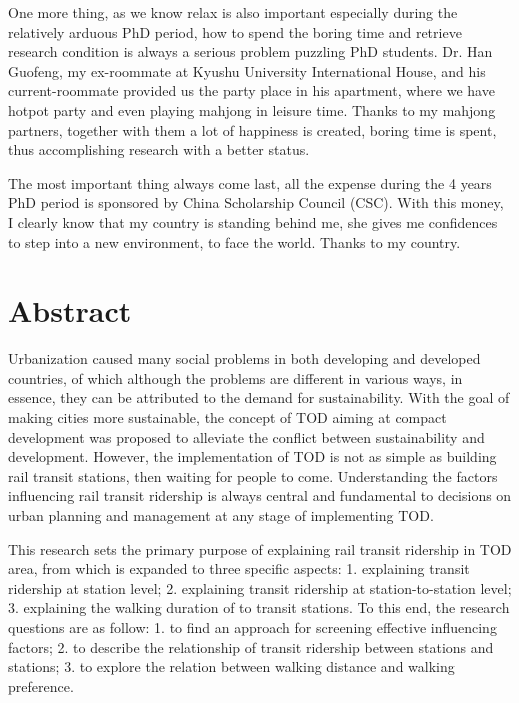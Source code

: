 \documentclass[12pt, twoside, a4paper]{book} %
\begin{document}
One more thing, as we know relax is also important especially during the relatively arduous PhD period, how to spend the boring time and retrieve research condition is always a serious problem puzzling PhD students. Dr. Han Guofeng, my ex-roommate at Kyushu University International House, and his current-roommate provided us the party place in his apartment, where we have hotpot party and even playing mahjong in leisure time. Thanks to my mahjong partners, together with them a lot of happiness is created, boring time is spent, thus accomplishing research with a better status.

The most important thing always come last, all the expense during the 4 years PhD period is sponsored by China Scholarship Council (CSC). With this money, I clearly know that my country is standing behind me, she gives me confidences to step into a new environment, to face the world. Thanks to my country.

\chapter{Abstract}
Urbanization caused many social problems in both developing and developed countries, of which although the problems are different in various ways, in essence, they can be attributed to the demand for sustainability. With the goal of making cities more sustainable, the concept of TOD aiming at compact development was proposed to alleviate the conflict between sustainability and development. However, the implementation of TOD is not as simple as building rail transit stations, then waiting for people to come. Understanding the factors influencing rail transit ridership is always central and fundamental to decisions on urban planning and management at any stage of implementing TOD.

This research sets the primary purpose of explaining rail transit ridership in TOD area, from which is expanded to three specific aspects: 1. explaining transit ridership at station level; 2. explaining transit ridership at station-to-station level; 3. explaining the walking duration of to transit stations. To this end, the research questions are as follow: 1. to find an approach for screening effective influencing factors; 2. to describe the relationship of transit ridership between stations and stations; 3. to explore the relation between walking distance and walking preference.
\end{document}

